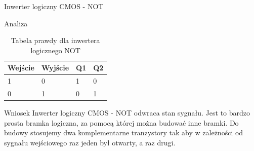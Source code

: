 \documentclass[a4paper]{scrartcl}
\begin{document}
\begin{section}{Inwerter logiczny CMOS - NOT}
\begin{subsection}{Analiza}
\begin{table}[!ht]
					\begin{center}
					\caption{Tabela prawdy dla inwertera logicznego NOT}
					\begin{tabular}{| l | l | l | l |}
						\hline
						Wejście & Wyjście & Q1 & Q2 \\\hline
						1 & 0 & 1 & 0 \\ \hline
						0 & 1 & 0 & 1 \\ \hline
					\end{tabular}
					\end{center}
				\end{table}
		\end{subsection}
		\begin{subsection}{Wniosek}
			Inwerter logiczny CMOS - NOT odwraca stan sygnału. Jest to bardzo prosta bramka logiczna, za pomocą której można budować inne bramki. Do budowy stosujemy dwa komplementarne tranzystory tak aby w zależności od sygnału wejściowego raz jeden był otwarty, a raz drugi.
		\end{subsection}
	\end{section}
\end{document}

